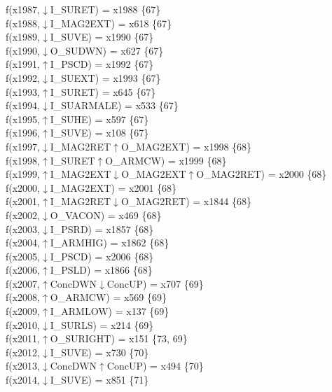 f(x1987,$\downarrow$I\_SURET) = x1988 \{67\} \\  
f(x1988,$\downarrow$I\_MAG2EXT) = x618 \{67\} \\  
f(x1989,$\downarrow$I\_SUVE) = x1990 \{67\} \\  
f(x1990,$\downarrow$O\_SUDWN) = x627 \{67\} \\  
f(x1991,$\uparrow$I\_PSCD) = x1992 \{67\} \\  
f(x1992,$\downarrow$I\_SUEXT) = x1993 \{67\} \\  
f(x1993,$\uparrow$I\_SURET) = x645 \{67\} \\  
f(x1994,$\downarrow$I\_SUARMALE) = x533 \{67\} \\  
f(x1995,$\uparrow$I\_SUHE) = x597 \{67\} \\  
f(x1996,$\uparrow$I\_SUVE) = x108 \{67\} \\  
f(x1997,$\downarrow$I\_MAG2RET$\uparrow$O\_MAG2EXT) = x1998 \{68\} \\  
f(x1998,$\uparrow$I\_SURET$\uparrow$O\_ARMCW) = x1999 \{68\} \\  
f(x1999,$\uparrow$I\_MAG2EXT$\downarrow$O\_MAG2EXT$\uparrow$O\_MAG2RET) = x2000 \{68\} \\  
f(x2000,$\downarrow$I\_MAG2EXT) = x2001 \{68\} \\  
f(x2001,$\uparrow$I\_MAG2RET$\downarrow$O\_MAG2RET) = x1844 \{68\} \\  
f(x2002,$\downarrow$O\_VACON) = x469 \{68\} \\  
f(x2003,$\downarrow$I\_PSRD) = x1857 \{68\} \\  
f(x2004,$\uparrow$I\_ARMHIG) = x1862 \{68\} \\  
f(x2005,$\downarrow$I\_PSCD) = x2006 \{68\} \\  
f(x2006,$\uparrow$I\_PSLD) = x1866 \{68\} \\  
f(x2007,$\uparrow$ConcDWN$\downarrow$ConcUP) = x707 \{69\} \\  
f(x2008,$\uparrow$O\_ARMCW) = x569 \{69\} \\  
f(x2009,$\uparrow$I\_ARMLOW) = x137 \{69\} \\  
f(x2010,$\downarrow$I\_SURLS) = x214 \{69\} \\  
f(x2011,$\uparrow$O\_SURIGHT) = x151 \{73, 69\} \\  
f(x2012,$\downarrow$I\_SUVE) = x730 \{70\} \\  
f(x2013,$\downarrow$ConcDWN$\uparrow$ConcUP) = x494 \{70\} \\  
f(x2014,$\downarrow$I\_SUVE) = x851 \{71\} \\  
